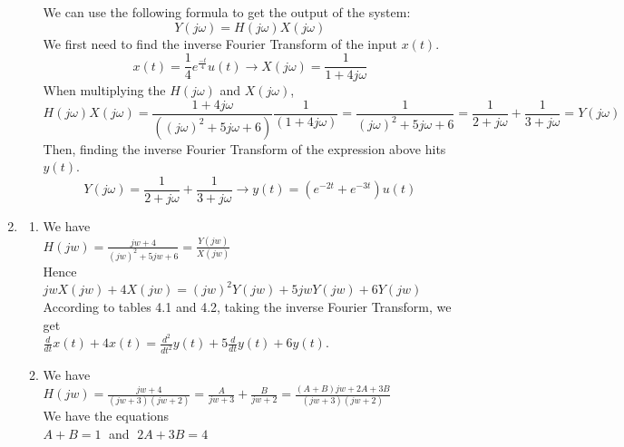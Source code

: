 \documentclass[10pt,a4paper, margin=1in]{article}
\begin{document}
\begin{enumerate}
\begin{enumerate}
        We can use the following formula to get the output of the system:
        $$Y(j\omega) = H(j\omega)X(j\omega)$$
        We first need to find the inverse Fourier Transform of the input $x(t)$.
        $$x(t) = \frac{1}{4}e^{\frac{-t}{4}}u(t) \rightarrow X(j\omega) = \frac{1}{1 + 4j\omega}$$
        When multiplying the $H(j\omega)$ and $X(j\omega)$,
        $$H(j\omega)X(j\omega) = \frac{1+ 4j\omega}{((j\omega)^2+5j\omega+6)} \frac{1}{(1+ 4j\omega)} = \frac{1}{(j\omega)^2+5j\omega+6} = \frac{1}{2 + j\omega} + \frac{1}{3 + j\omega} = Y(j\omega)$$
        Then, finding the inverse Fourier Transform of the expression above hits $y(t)$.
        $$Y(j\omega) = \frac{1}{2 + j\omega} + \frac{1}{3 + j\omega}\rightarrow y(t)=(e^{-2t}+e^{-3t})u(t)$$
    \end{enumerate}

\item %
	\begin{enumerate}
    \item %
    We have\vspace{0.3cm}\\
    $H(jw) = \frac{jw+4}{(jw)^2+5jw+6} = \frac{Y(jw)}{X(jw)}$\vspace{0.3cm}\\
    Hence\vspace{0.3cm}\\
    $jwX(jw) + 4X(jw) = (jw)^2Y(jw)+5jwY(jw)+6Y(jw)$\vspace{0.3cm}\\
    According to tables 4.1 and 4.2, taking the inverse Fourier Transform, we get\vspace{0.3cm}\\
    $\frac{d}{dt}x(t)+4x(t) = \frac{d^2}{dt^2}y(t)+5\frac{d}{dt}y(t)+6y(t)$.\vspace{0.3cm}\\
    \item %
    We have\vspace{0.3cm}\\
    $H(jw) = \frac{jw+4}{(jw+3)(jw+2)} = \frac{A}{jw+3}+\frac{B}{jw+2} = \frac{(A+B)jw+2A+3B}{(jw+3)(jw+2)}$\vspace{0.3cm}\\
    We have the equations\vspace{0.3cm}\\
    $A+B=1\;$ and $\; 2A+3B=4$\vspace{0.3cm}\\

\end{enumerate}
\end{enumerate}
\end{document}
